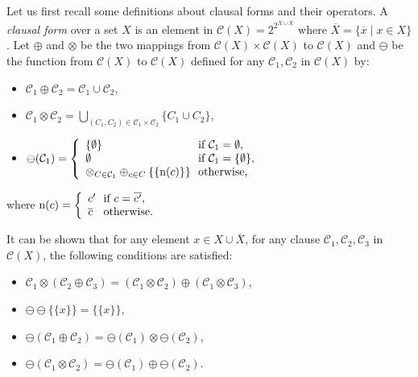 \documentclass{article}
\newcommand{\ocap}{\otimes}
\newcommand{\ocup}{\oplus}
\newcommand{\oneg}{\ominus}
\begin{document}
    \medskip
    
    Let us first recall some definitions about clausal forms and their operators.  
  A \emph{clausal form} over a set $X$ is an element in $\mathcal{C}(X)=2^{2^{X\cup \overline{X}}}$ where $\overline{X}=\{\overline{x}\mid x\in X\}$. Let $\ocup$ and $\ocap$ be the two mappings from $\mathcal{C}(X)\times \mathcal{C}(X)$ to $\mathcal{C}(X)$ and $\oneg$ be the function from $\mathcal{C}(X)$  to $\mathcal{C}(X)$ defined for any $\mathcal{C}_1,\mathcal{C}_2$ in $\mathcal{C}(X)$ by:
  
  \begin{itemize}
    \item $\mathcal{C}_1\ocup \mathcal{C}_2 =\mathcal{C}_1\cup \mathcal{C}_2$,
    \item $\mathcal{C}_1\ocap \mathcal{C}_2 =\bigcup_{(C_1,C_2)\in \mathcal{C}_1\times\mathcal{C}_2}\{C_1\cup C_2\}$, 
    \item   $ \oneg(\mathcal{C}_1) =\left\{
          \begin{array}{l@{\ }l}
            \{\emptyset\} & \text{ if } \mathcal{C}_1=\emptyset,\\
            \emptyset & \text{ if } \mathcal{C}_1=\{\emptyset\},\\
            \ocap_{C\in\mathcal{C}_1}  \ocup_{c\in C} \{\{\mathrm{n}(c)\} \} & \text{ otherwise,}\
          \end{array}
        \right.$  
  \end{itemize}
  
  where $\mathrm{n}(c) =
          \left\{
            \begin{array}{l@{\ }l}
              c' & \text{ if }c=\overline{c'},\\
              \overline{c} & \text{ otherwise.}
            \end{array}
          \right.$
  
  It can be shown that for any element $x\in X\cup \overline{X}$, for any clause $\mathcal{C}_1,\mathcal{C}_2,\mathcal{C}_3$ in $\mathcal{C}(X)$, the following conditions are satisfied:
  
  \begin{itemize}
    \item $\mathcal{C}_1 \ocap(\mathcal{C}_2\ocup \mathcal{C}_3)=(\mathcal{C}_1 \ocap \mathcal{C}_2)\ocup (\mathcal{C}_1 \ocap \mathcal{C}_3)$,
    \item $\oneg\oneg\{\{x\}\}=\{\{x\}\}$,
    \item $\oneg(\mathcal{C}_1\ocup\mathcal{C}_2)=\oneg(\mathcal{C}_1)\ocap \oneg(\mathcal{C}_2)$,
    \item $\oneg(\mathcal{C}_1\ocap\mathcal{C}_2)=\oneg(\mathcal{C}_1)\ocup \oneg(\mathcal{C}_2)$.
  \end{itemize}
  
\end{document}
